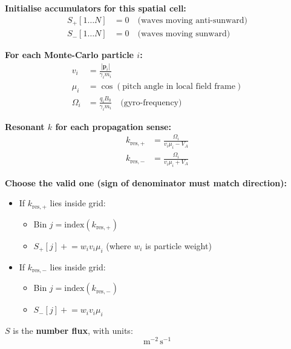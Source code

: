 \begin{tcolorbox}[colframe=black, colback=white, title=Wave Accumulator Initialization and Update]
\textbf{Initialise accumulators for this spatial cell:}
\begin{align*}
S_{+}[1 \ldots N] &= 0 \quad \text{(waves moving anti-sunward)} \\
S_{-}[1 \ldots N] &= 0 \quad \text{(waves moving sunward)}
\end{align*}

\textbf{For each Monte-Carlo particle \( i \):}
\begin{align*}
v_i &= \frac{|\mathbf{p}_i|}{\gamma_i m_i} \\
\mu_i &= \cos(\text{pitch angle in local field frame}) \\
\Omega_i &= \frac{q_i B_0}{\gamma_i m_i} \quad \text{(gyro-frequency)}
\end{align*}

\textbf{Resonant \( k \) for each propagation sense:}
\begin{align*}
k_{\text{res},+} &= \frac{\Omega_i}{v_i \mu_i - V_A} \\
k_{\text{res},-} &= \frac{\Omega_i}{v_i \mu_i + V_A}
\end{align*}

\textbf{Choose the valid one (sign of denominator must match direction):}
\begin{itemize}
  \item If \( k_{\text{res},+} \) lies inside grid:
  \begin{itemize}
    \item Bin \( j = \text{index}(k_{\text{res},+}) \)
    \item \( S_{+}[j] \mathrel{+}= w_i v_i \mu_i \) \quad (where \( w_i \) is particle weight)
  \end{itemize}
  \item If \( k_{\text{res},-} \) lies inside grid:
  \begin{itemize}
    \item Bin \( j = \text{index}(k_{\text{res},-}) \)
    \item \( S_{-}[j] \mathrel{+}= w_i v_i \mu_i \)
  \end{itemize}
\end{itemize}
\end{tcolorbox}

\begin{tcolorbox}[colframe=black, colback=white, title=Units]
\( S \) is the \textbf{number flux}, with units:
\[
\text{m}^{-2} \, \text{s}^{-1}
\]
\end{tcolorbox}



